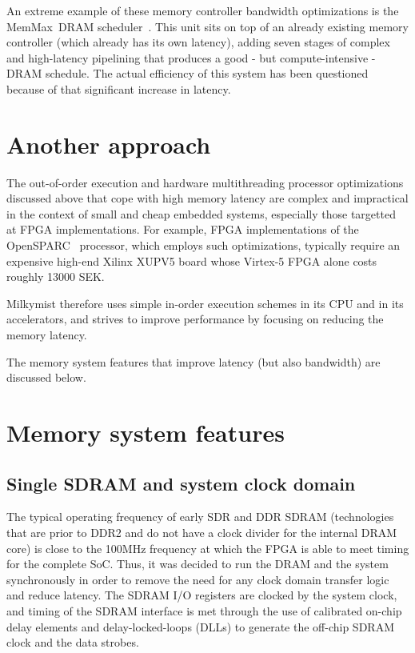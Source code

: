 \documentclass[a4paper,11pt]{kthesis}
\begin{document}
An extreme example of these memory controller bandwidth optimizations is the MemMax\textregistered ~DRAM scheduler~\cite{memmax}. This unit sits on top of an already existing memory controller (which already has its own latency), adding seven stages of complex and high-latency pipelining that produces a good - but compute-intensive - DRAM schedule. The actual efficiency of this system has been questioned~\cite{dramqos} because of that significant increase in latency.

\section{Another approach}
The out-of-order execution and hardware multithreading processor optimizations discussed above that cope with high memory latency are complex and impractical in the context of small and cheap embedded systems, especially those targetted at FPGA implementations. For example, FPGA implementations of the OpenSPARC~\cite{opensparc} processor, which employs such optimizations, typically require an expensive high-end Xilinx XUPV5 board whose Virtex-5 FPGA alone costs roughly 13000 SEK.

Milkymist therefore uses simple in-order execution schemes in its CPU and in its accelerators, and strives to improve performance by focusing on reducing the memory latency.

The memory system features that improve latency (but also bandwidth) are discussed below.

\section{Memory system features}
\subsection{Single SDRAM and system clock domain}
The typical operating frequency of early SDR and DDR SDRAM (technologies that are prior to DDR2 and do not have a clock divider for the internal DRAM core) is close to the 100MHz frequency at which the FPGA is able to meet timing for the complete SoC. Thus, it was decided to run the DRAM and the system synchronously in order to remove the need for any clock domain transfer logic and reduce latency. The SDRAM I/O registers are clocked by the system clock, and timing of the SDRAM interface is met through the use of calibrated on-chip delay elements and delay-locked-loops (DLLs) to generate the off-chip SDRAM clock and the data strobes.
\end{document}
